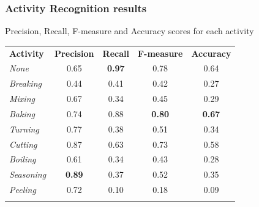 \documentclass{beamer}
\begin{document}
\begin{frame}[c]\frametitle{Activity Recognition results}
	Precision, Recall, F-measure and Accuracy scores for each activity
	\begin{table}[tb!]
        \centering
        \footnotesize
        \begin{tabular}{l|cccc} 
            \hline\noalign{\smallskip}
            \textbf{Activity} & \textbf{Precision} & \textbf{Recall} & \textbf{F-measure} & \textbf{Accuracy} \\ 
            \noalign{\smallskip}\hline\hline\noalign{\smallskip}
            \textit{None}      &         0.65  & \textbf{0.97} &         0.78             &         0.64      \\ 
            \textit{Breaking}  &         0.44  &         0.41  &         0.42             &         0.27      \\
            \textit{Mixing}    &         0.67  &         0.34  &         0.45             &         0.29      \\
            \textit{Baking}    &         0.74  &         0.88  & \textbf{0.80}            & \textbf{0.67}     \\
            \textit{Turning}   &         0.77  &         0.38  &         0.51             &         0.34      \\
            \textit{Cutting}   &         0.87  &         0.63  &         0.73             &         0.58      \\
            \textit{Boiling}   &         0.61  &         0.34  &         0.43             &         0.28      \\
            \textit{Seasoning} & \textbf{0.89} &         0.37  &         0.52             &         0.35      \\
            \textit{Peeling}   &         0.72  &         0.10  &         0.18             &         0.09      \\
            \noalign{\smallskip}\hline
        \end{tabular}
    \end{table}
\end{frame}
\end{document}
